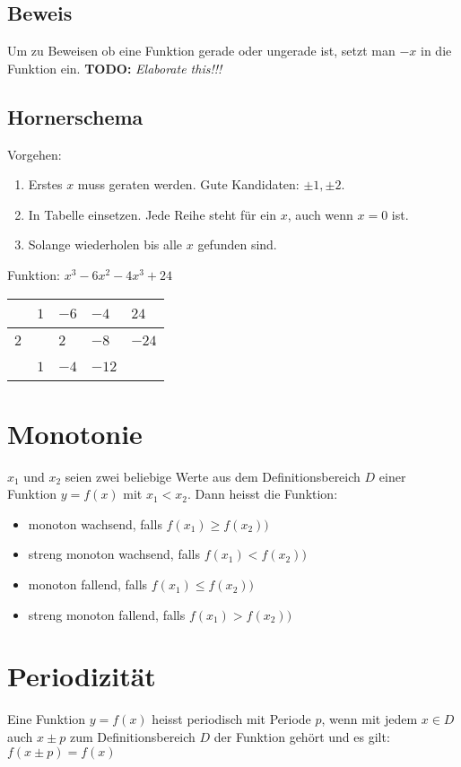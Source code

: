 \subsection{Beweis}
Um zu Beweisen ob eine Funktion gerade oder ungerade ist, setzt man $-x$ in die Funktion ein.
\textbf{TODO: }\textit{Elaborate this!!!}

\subsection{Hornerschema}
Vorgehen:
\begin{enumerate}
	\item Erstes \(x\) muss geraten werden. Gute Kandidaten: \(\pm 1, \pm 2\). 
	\item In Tabelle einsetzen. Jede Reihe steht für ein \(x\), auch wenn \(x=0\) ist.
	\item Solange wiederholen bis alle \(x\) gefunden sind.
\end{enumerate}
Funktion: \( x^3-6x^2-4x^3+24\) \newline
\newline
\begin{tabular}{l|l|l|l|l}
	~ & \(1\) & \(-6\) & \(-4\) & \(24\) \\ \hline
	\(2\)& ~ & \(2\) & \(-8\) & \(-24\) \\ \hline
	~ & \(1\) & \(-4\) & \(-12\) & ~ \\ 
\end{tabular}

\section{Monotonie}
\(x_{1}\) und \(x_{2}\) seien zwei beliebige Werte aus dem Definitionsbereich \(D\) einer Funktion \(y = f(x)\) mit \(x_{1} < x_{2}\). Dann heisst die Funktion:
\begin{itemize}
	\item monoton wachsend, falls \(f(x_{1}) \ge f(x_{2}))\)
	\item streng monoton wachsend, falls \(f(x_{1}) < f(x_{2}))\)
	\item monoton fallend, falls \(f(x_{1}) \le f(x_{2}))\)
	\item streng monoton fallend, falls \(f(x_{1}) > f(x_{2}))\)
\end{itemize}

\section{Periodizität}
Eine Funktion \(y = f(x)\) heisst periodisch mit Periode \(p\), wenn mit jedem \(x \in D\) auch \(x \pm p\) zum Definitionsbereich \(D\) der Funktion gehört und es gilt:
\newline \(f(x \pm p) = f(x)\)

